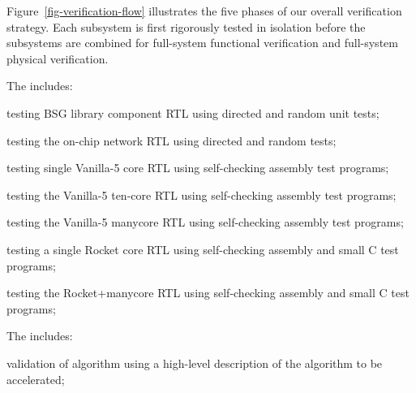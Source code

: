 

Figure~\ref{fig-verification-flow} illustrates the five phases
of our overall verification strategy. Each subsystem is first rigorously
tested in isolation before the subsystems are combined for full-system
functional verification and full-system physical verification.

\medskip
\begin{cbxlist}{1.5em}{1em}{1em}

 \item The 
    includes:

    \smallskip
    \begin{cbxlist}[--]{1.5em}{0em}{0em}
      \raggedright

      \item testing BSG library component RTL using directed and random
         unit tests;
      \item testing the on-chip network RTL using directed and random
         tests;

      \item testing single Vanilla-5 core RTL using self-checking
         assembly test programs;

      \item testing the Vanilla-5 ten-core RTL using self-checking
         assembly test programs;

      \item testing the Vanilla-5 manycore RTL using self-checking
         assembly test programs;

      \item testing a single Rocket core RTL using self-checking
         assembly and small C test programs;

      \item testing the Rocket+manycore RTL using self-checking assembly
         and small C test programs;

    \end{cbxlist}

 \item The  includes:

    \smallskip
    \begin{cbxlist}[--]{1.5em}{0em}{0em}
      \raggedright

      \item validation of algorithm using a high-level description of the
         algorithm to be accelerated;


\end{cbxlist}
\end{cbxlist}
